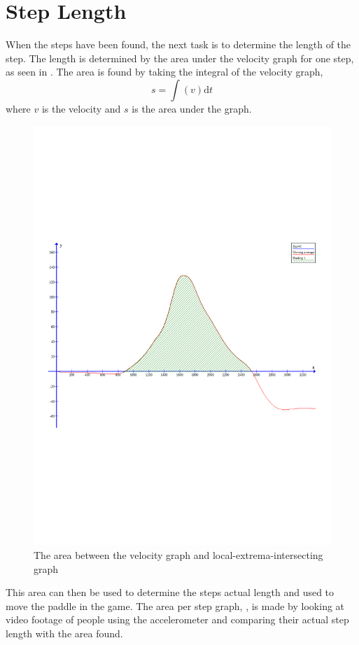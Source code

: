 \section{Step Length}
When the steps have been found, the next task is to determine the length of the step.
The length is determined by the area under the velocity graph for one step, as seen in .
The area is found by taking the integral of the velocity graph,
$$s = \int (v)\mathrm{d}t$$
where $v$ is the velocity and $s$ is the area under the graph.
\begin{figure}[h]
	\centering	
	\includegraphics[scale=0.4]{media/area3}
	\caption{The area between the velocity graph and local-extrema-intersecting graph}
	\label{figure:area}
\end{figure}

This area can then be used to determine the steps actual length and used to move the paddle in the game.
The area per step graph, \figref{}, is made by looking at video footage of people using the accelerometer and comparing their actual step length with the area found.